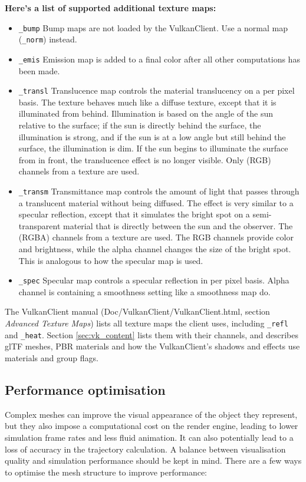 \documentclass[Orbiter Developer Manual.tex]{subfiles}
\begin{document}
\textbf{Here's a list of supported additional texture maps:}
\begin{itemize}
\item	\texttt{\_bump} Bump maps are not loaded by the VulkanClient. Use a normal map (\texttt{\_norm}) instead.
\item	\texttt{\_emis} Emission map is added to a final color after all other computations has been made. 
\item	\texttt{\_transl} Translucence map controls the material translucency on a per pixel basis. The texture behaves much like a diffuse texture, except that it is illuminated from behind. Illumination is based on the angle of the sun relative to the surface; if the sun is directly behind the surface, the illumination is strong, and if the sun is at a low angle but still behind the surface, the illumination is dim. If the sun begins to illuminate the surface from in front, the translucence effect is no longer visible. Only (RGB) channels from a texture are used. 
\item	\texttt{\_transm} Transmittance map controls the amount of light that passes through a translucent material without being diffused. The effect is very similar to a specular reflection, except that it simulates the bright spot on a semi-transparent material that is directly between the sun and the observer. The (RGBA) channels from a texture are used. The RGB channels provide color and brightness, while the alpha channel changes the size of the bright spot. This is analogous to how the specular map is used.
\item	\texttt{\_spec} Specular map controls a specular reflection in per pixel basis. Alpha channel is containing a smoothness setting like a smoothness map do.
\end{itemize}
The VulkanClient manual (Doc/VulkanClient/VulkanClient.html, section \textit{Advanced Texture Maps}) lists all texture maps the client uses, including \texttt{\_refl} and \texttt{\_heat}. Section \ref{sec:vk_content} lists them with their channels, and describes glTF meshes, PBR materials and how the VulkanClient's shadows and effects use materials and group flags.

\break
\subsection{Performance optimisation}
Complex meshes can improve the visual appearance of the object they represent, but they also impose a computational cost on the render engine, leading to lower simulation frame rates and less fluid animation. It can also potentially lead to a loss of accuracy in the trajectory calculation. A balance between visualisation quality and simulation performance should be kept in mind. There are a few ways to optimise the mesh structure to improve performance:
\end{document}
